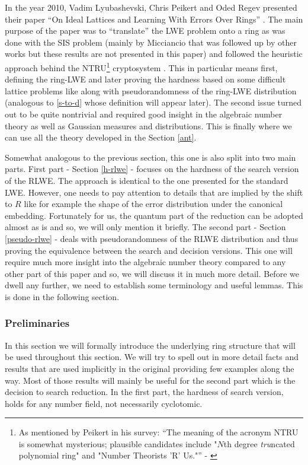 In the year 2010, Vadim Lyubashevski, Chris Peikert and Oded Regev presented their paper ``On Ideal Lattices and Learning With Errors Over Rings'' \cite{ring-lwe}. The main purpose of the paper was to ``translate'' the LWE problem onto a ring as was done with the SIS problem (mainly by Micciancio \cite{ring-sis} that was followed up by other works but these results are not presented in this paper) and followed the heuristic approach behind the NTRU\footnote{As mentioned by Peikert in his survey: ``The meaning of the acronym NTRU is somewhat mysterious; plausible candidates include "$N$th degree \textit{tru}ncated polynomial ring" and "Number Theorists ’R’ Us."'' - \cite{lattice-survey}} cryptosystem \cite{ntru}. This in particular means first, defining the ring-LWE and later proving the hardness based on some difficult lattice problems like  along with pseudorandomness of the ring-LWE distribution (analogous to \ref{s-to-d} whose definition will appear later). The second issue turned out to be quite nontrivial and required good insight in the algebraic number theory as well as Gaussian measures and distributions. This is finally where we can use all the theory developed in the Section \ref{ant}.

Somewhat analogous to the previous section, this one is also split into two main parts. First part - Section \ref{h-rlwe} - focuses on the hardness of the search version of the RLWE. The approach is identical to the one presented for the standard LWE. However, one needs to pay attention to details that are implied by the shift to $R$ like for example the shape of the error distribution under the canonical embedding. Fortunately for us, the quantum part of the reduction can be adopted almost as is and so, we will only mention it briefly. The second part - Section \ref{pseudo-rlwe} - deals with pseudorandomness of the RLWE distribution and thus proving the equivalence between the search and decision versions. This one will require much more insight into the algebraic number theory compared to any other part of this paper and so, we will discuss it in much more detail. Before we dwell any further, we need to establish some terminology and useful lemmas. This is done in the following section.

\subsubsection{Preliminaries}
In this section we will formally introduce the underlying ring structure that will be used throughout this section. We will try to spell out in more detail facts and results that are used implicitly in the original \cite{ring-lwe} providing few examples along the way. Most of those results will mainly be useful for the second part which is the decision to search reduction. In the first part, the hardness of search version, holds for any number field, not necessarily cyclotomic.


